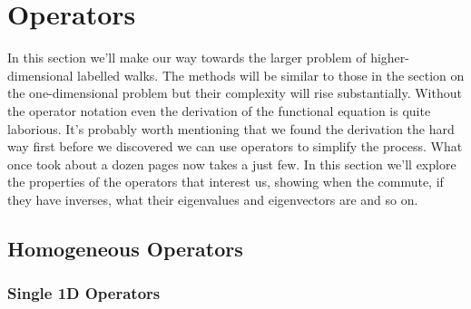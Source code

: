 
\chapter{Operators}
\label{ch:Operators}

In this section we'll make our way towards the larger problem of higher-dimensional labelled walks. The methods will be similar to those in the section on the one-dimensional problem but their complexity will rise substantially. Without the operator notation even the derivation of the functional equation is quite laborious. It's probably worth mentioning that we found the derivation the hard way first before we discovered we can use operators to simplify the process. What once took about a dozen pages now takes a just few. In this section we'll explore the properties of the operators that interest us, showing when the commute, if they have inverses, what their eigenvalues and eigenvectors are and so on.


\section{Homogeneous Operators}

\subsection{Single 1D Operators}

